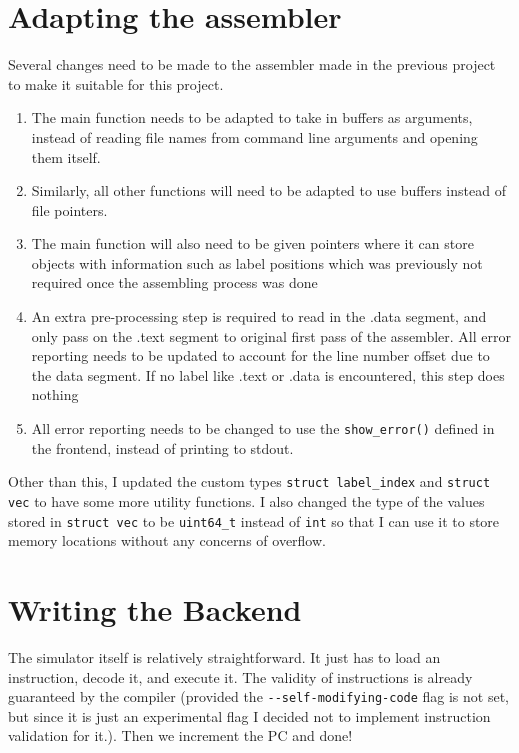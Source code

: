 \documentclass[12pt]{article}
\begin{document}
	\section{Adapting the assembler}

	Several changes need to be made to the assembler made in the previous project to make it suitable for this project.

	\begin{enumerate}
		\item The main function needs to be adapted to take in buffers as arguments, instead of reading file names from command line arguments and opening them itself.
		\item Similarly, all other functions will need to be adapted to use buffers instead of file pointers.
		\item The main function will also need to be given pointers where it can store objects with information such as label positions which was previously not required once the assembling process was done
		\item An extra pre-processing step is required to read in the .data segment, and only pass on the .text segment to original first pass of the assembler. All error reporting needs to be updated to account for the line number offset due to the data segment. If no label like .text or .data is encountered, this step does nothing
		\item All error reporting needs to be changed to use the \verb|show_error()| defined in the frontend, instead of printing to stdout.
	\end{enumerate}

	Other than this, I updated the custom types \verb|struct label_index| and \verb|struct vec| to have some more utility functions. I also changed the type of the values stored in \verb|struct vec| to be \verb|uint64_t| instead of \verb|int| so that I can use it to store memory locations without any concerns of overflow.

	\section{Writing the Backend}
	
	The simulator itself is relatively straightforward. It just has to load an instruction, decode it, and execute it. The validity of instructions is already guaranteed by the compiler (provided the \verb|--self-modifying-code| flag is not set, but since it is just an experimental flag I decided not to implement instruction validation for it.). Then we increment the PC and done! 
	
\end{document}
